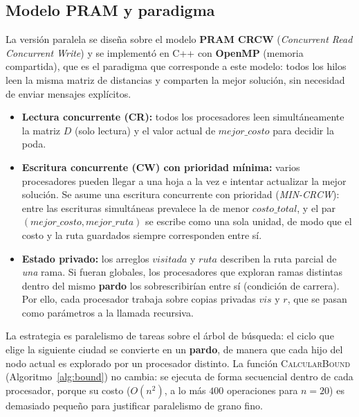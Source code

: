 \documentclass[12pt,a4paper]{article}
\begin{document}
\subsection{Modelo PRAM y paradigma}

La versión paralela se diseña sobre el modelo \textbf{PRAM CRCW} (\textit{Concurrent Read Concurrent Write}) y se implementó en C++ con \textbf{OpenMP} (memoria compartida), que es el paradigma que corresponde a este modelo: todos los hilos leen la misma matriz de distancias y comparten la mejor solución, sin necesidad de enviar mensajes explícitos.
\begin{itemize}
    \item \textbf{Lectura concurrente (CR):} todos los procesadores leen simultáneamente la matriz $D$ (solo lectura) y el valor actual de $mejor\_costo$ para decidir la poda.
    \item \textbf{Escritura concurrente (CW) con prioridad mínima:} varios procesadores pueden llegar a una hoja a la vez e intentar actualizar la mejor solución. Se asume una escritura concurrente con prioridad (\textit{MIN-CRCW}): entre las escrituras simultáneas prevalece la de menor $costo\_total$, y el par $(mejor\_costo, mejor\_ruta)$ se escribe como una sola unidad, de modo que el costo y la ruta guardados siempre corresponden entre sí.
    \item \textbf{Estado privado:} los arreglos $visitada$ y $ruta$ describen la ruta parcial de \emph{una} rama. Si fueran globales, los procesadores que exploran ramas distintas dentro del mismo \textbf{pardo} los sobrescribirían entre sí (condición de carrera). Por ello, cada procesador trabaja sobre copias privadas $vis$ y $r$, que se pasan como parámetros a la llamada recursiva.
\end{itemize}

La estrategia es paralelismo de tareas sobre el árbol de búsqueda: el ciclo que elige la siguiente ciudad se convierte en un \textbf{pardo}, de manera que cada hijo del nodo actual es explorado por un procesador distinto. La función \textsc{CalcularBound} (Algoritmo~\ref{alg:bound}) no cambia: se ejecuta de forma secuencial dentro de cada procesador, porque su costo ($O(n^2)$, a lo más $400$ operaciones para $n=20$) es demasiado pequeño para justificar paralelismo de grano fino.
\end{document}
